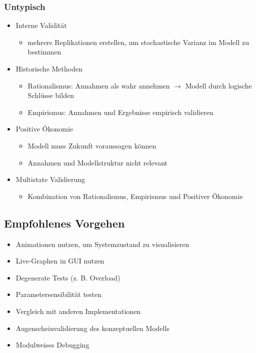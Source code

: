 \documentclass[nonacm=true, language=german]{acmart}
\begin{document}
\newpage

\subsubsection{Untypisch}

\begin{itemize}
    \item Interne Validität
    \begin{itemize}
        \item mehrere Replikationen erstellen, um stochastische Varianz im Modell zu bestimmen
    \end{itemize}
    \item Historische Methoden
    \begin{itemize}
        \item Rationalismus: Annahmen als wahr annehmen $\rightarrow$ Modell durch logische Schlüsse bilden
        \item Empirismus: Annahmen und Ergebnisse empirisch validieren
    \end{itemize}
    \item Positive Ökonomie
    \begin{itemize}
        \item Modell muss Zukunft voraussagen können
        \item Annahmen und Modellstruktur nicht relevant
    \end{itemize}
    \item Multistate Validierung
    \begin{itemize}
        \item Kombination von Rationalismus, Empirismus und Positiver Ökonomie
    \end{itemize}
\end{itemize}

\subsection{Empfohlenes Vorgehen}

\begin{itemize}
    \item Animationen nutzen, um Systemzustand zu visualisieren
    \item Live-Graphen in GUI nutzen
    \item Degenerate Tests (z. B. Overload)
    \item Parametersensibilität testen
    \item Vergleich mit anderen Implementationen
    \item Augenscheinvalidierung des konzeptuellen Modells
    \item Modulweises Debugging
\end{itemize}
\end{document}
